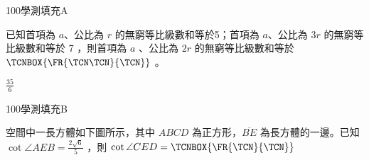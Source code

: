 \begin{QUESTIONS}
    \begin{QUESTION}
        \begin{ExamInfo}{100}{學測}{填充}{A}
        \end{ExamInfo}
        \begin{ExamAnsRateInfo}{49}{92}{50}{5}
        \end{ExamAnsRateInfo}
        \begin{QBODY}
            已知首項為 $a$、公比為 $r$ 的無窮等比級數和等於5；首項為 $a$、公比為 $3r$ 的無窮等比級數和等於 7 ，則首項為 $a$ 、公比為 $2r$ 的無窮等比級數和等於 $\TCNBOX{\FR{\TCN\TCN}{\TCN}}$ 。
        \end{QBODY}
        \begin{QFROMS}
        \end{QFROMS}
        \begin{QTAGS}\end{QTAGS}
        \begin{QANS}
            $\frac{35}{6}$
        \end{QANS}
        \begin{QSOLLIST}
        \end{QSOLLIST}
        \begin{QEMPTYSPACE}
        \end{QEMPTYSPACE}
    \end{QUESTION}
    \begin{QUESTION}
        \begin{ExamInfo}{100}{學測}{填充}{B}
        \end{ExamInfo}
        \begin{ExamAnsRateInfo}{55}{92}{61}{12}
        \end{ExamAnsRateInfo}
        \begin{QBODY}
            空間中一長方體如下圖所示，其中 $ABCD$ 為正方形，$\overline{BE}$ 為長方體的一邊。已知 $\cot \angle AEB = \frac{2\sqrt{6}}{5}$ ，則 $\cot \angle CED = \TCNBOX{\FR{\TCN}{\TCN}}$ 


\end{QBODY}
\end{QUESTION}
\end{QUESTIONS}
